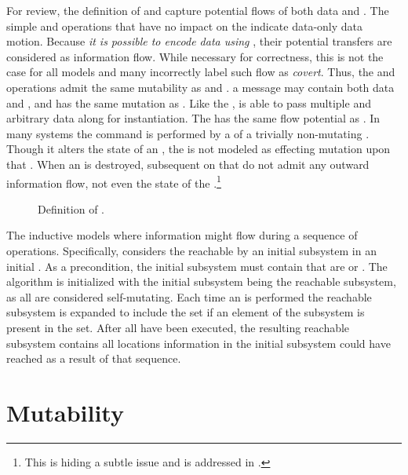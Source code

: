 For review, the definition of \COQreadFromSpec{} and \COQwroteToSpec{} capture potential flows of both data and \TMcaps{}.
The simple \NMread{} and \NMwrite{} operations that have no impact on the \TMsystemState{} indicate data-only data motion.
Because \emph{it is possible to encode data using \TMcaps{}}, their potential transfers are considered as information flow.
While necessary for correctness, this is not the case for all models and many incorrectly label such flow as \emph{covert}.
Thus, the \TMfetch{} and \TMstore{} operations admit the same mutability as \COQread{} and \COQwrite{}.
\xmakefirstuc{\TMsending{}} a message may contain both data and \TMcaps{}, and has the same mutation as \COQwrite{}.
Like the \COQsend{} \TMop{}, \TMcreate{} is able to pass multiple \TMcaps{} and arbitrary data along for \TMobj{} instantiation.
The \COQrevoke{} \TMop{} has the same flow potential as \COQwrite{}.  In many systems the \TMrevoke{} command is performed by a \COQwrite{} of a trivially non-mutating \TMcap{}.
Though it alters the state of an \TMobj{}, the \COQdestroy{} \TMop{} is not modeled as effecting mutation upon that \TMobj{}.
When an \TMobj{} is destroyed, subsequent \TMops{} on that \TMobj{} do not admit any outward information flow, not even the state of the \TMobj{}.\footnote{This is hiding a subtle issue and is addressed in .}

\begin{figure}
  \COQDOCmutatedOpDef{}
  \COQDOCmutatedDef{}
  \caption{Definition of \COQmutated{}. \label{def:flow:mutated}}
\end{figure}

The \COQmutatedDef{} inductive models where information might flow during a sequence of operations.
Specifically, \COQmutatedDef{} considers the \TMobjs{} reachable by an initial subsystem in an initial \TMsystemState{}.
As a precondition, the initial subsystem must contain \TMobjs{} that are \TMalive{} or \TMdead{}.
The algorithm is initialized with the initial subsystem being the reachable subsystem, as all \TMobjs{} are considered self-mutating.
Each time an \TMop{} is performed the reachable subsystem is expanded to include the \COQwroteTo{} set if an element of the subsystem is present in the \COQreadFrom{} set.
After all \TMops{} have been executed, the resulting reachable subsystem contains all locations information in the initial subsystem could have reached as a result of that \TMop{} sequence.

\section{Mutability}


